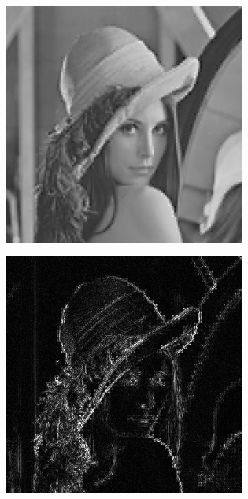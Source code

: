 \begin{figure}[h!]
\begin{subfigure}[b]{0.3\linewidth}
		\includegraphics[width=\linewidth]{myfigure/p7/7_zonal_2.png}
		\caption{}
		\label{fig:7zonal2}
	\end{subfigure}
	\begin{subfigure}[b]{0.3\linewidth}
		\includegraphics[width=\linewidth]{myfigure/p7/7_zonal_2_diff.png}

\end{subfigure}
\end{figure}

